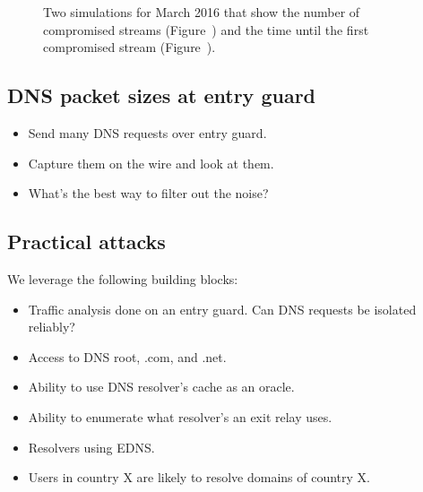 \begin{figure}[t]
\centering
{}
\caption{Two simulations for March 2016 that show the number of compromised
	streams (Figure~) and the time until the
	first compromised stream (Figure~).}
\label{fig:compromise-stream-time}
\end{figure}

\subsection{DNS packet sizes at entry guard}
\begin{itemize}
	\item Send many DNS requests over entry guard.
	\item Capture them on the wire and look at them.
	\item What's the best way to filter out the noise?
\end{itemize}

\subsection{Practical attacks}
We leverage the following building blocks:
\begin{itemize}
	\item Traffic analysis done on an entry guard.  Can DNS requests be isolated
		reliably?
	\item Access to DNS root, .com, and .net.
	\item Ability to use DNS resolver's cache as an oracle.
	\item Ability to enumerate what resolver's an exit relay uses.
	\item Resolvers using EDNS.
	\item Users in country X are likely to resolve domains of country X.
\end{itemize}
